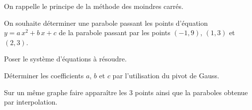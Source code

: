 
On rappelle le principe de la méthode des moindres carrés.

On souhaite déterminer une parabole passant les points d'équation $y=a\,x^2+b\,x+c$ de la parabole passant par les points $(-1,9)$, $(1,3)$ et $(2,3)$.

\question{} Poser le système d'équations à résoudre.

\question{} Déterminer les coefficients $a$, $b$ et $c$ par l'utilisation du pivot de Gauss.

\question{} Sur un même graphe faire apparaître les 3 points ainsi que la paraboles obtenue par interpolation.